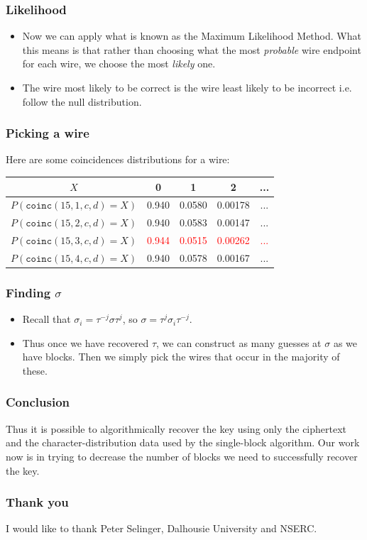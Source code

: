 \documentclass{beamer}
\newcommand{\slide}[2]{
	\begin{frame}
		\frametitle{#1}
		#2
	\end{frame}
}
\begin{document}
\slide{Likelihood} {
	\begin{itemize}
	\item Now we can apply what is known as the Maximum Likelihood Method. What this means is that rather than choosing what the most \emph{probable} wire endpoint for each wire, we choose the most \emph{likely} one.
	\item The wire most likely to be correct is the wire least likely to be incorrect i.e. follow the null distribution.
	\end{itemize}
}



\slide{Picking a wire} {
	Here are some coincidences distributions for a wire:
\begin{center}
\begin{tabular}{|c|c|c|c|c|}
\hline
$X$ & 0 & 1 & 2 & ... \\
\hline 
$P(\texttt{coinc}(15,1,c,d)=X)$ & 0.940 & 0.0580 & 0.00178 & ... \\
$P(\texttt{coinc}(15,2,c,d)=X)$ & 0.940 & 0.0583 & 0.00147 & ... \\
$P(\texttt{coinc}(15,3,c,d)=X)$ & \textcolor{red}{0.944} & \textcolor{red}{0.0515} & \textcolor{red}{0.00262} & \textcolor{red}{...} \\
$P(\texttt{coinc}(15,4,c,d)=X)$ & 0.940 & 0.0578 & 0.00167 & ... \\

\hline

\end{tabular}
\end{center}
}

\slide{Finding $\sigma$} {
	\begin{itemize}
		\item Recall that $\sigma_i = \tau^{-j} \sigma \tau^j$, so $\sigma = \tau^j \sigma_i \tau^{-j}$.
		\item Thus once we have recovered $\tau$, we can construct as many guesses at $\sigma$ as we have blocks. Then we simply pick the wires that occur in the majority of these.
	\end{itemize}
}

\slide{Conclusion}{
	Thus it is possible to algorithmically recover the key using only the ciphertext and the character-distribution data used by the single-block algorithm. Our work now is in trying to decrease the number of blocks we need to successfully recover the key. 
}

\slide{Thank you}{
	I would like to thank Peter Selinger, Dalhousie University and NSERC.
}

\end{document}
